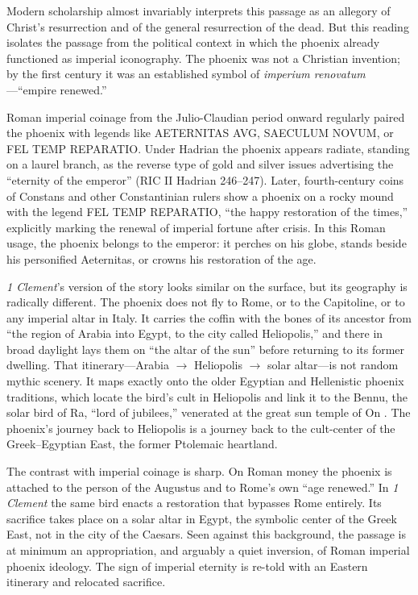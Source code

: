 Modern scholarship almost invariably interprets this passage as an allegory of Christ's resurrection and of the general resurrection of the dead.
But this reading isolates the passage from the political context in which the phoenix already functioned as imperial iconography.
The phoenix was not a Christian invention; by the first century it was an established symbol of \emph{imperium renovatum}---``empire renewed.''

Roman imperial coinage from the Julio-Claudian period onward regularly paired the phoenix with legends like AETERNITAS AVG, SAECULUM NOVUM, or FEL TEMP REPARATIO.
Under Hadrian the phoenix appears radiate, standing on a laurel branch, as the reverse type of gold and silver issues advertising the ``eternity of the emperor'' (RIC II Hadrian 246--247).
Later, fourth-century coins of Constans and other Constantinian rulers show a phoenix on a rocky mound with the legend FEL TEMP REPARATIO, ``the happy restoration of the times,'' explicitly marking the renewal of imperial fortune after crisis.
In this Roman usage, the phoenix belongs to the emperor: it perches on his globe, stands beside his personified Aeternitas, or crowns his restoration of the age.

\emph{1 Clement}'s version of the story looks similar on the surface, but its geography is radically different.
The phoenix does not fly to Rome, or to the Capitoline, or to any imperial altar in Italy.
It carries the coffin with the bones of its ancestor from ``the region of Arabia into Egypt, to the city called Heliopolis,'' and there in broad daylight lays them on ``the altar of the sun'' before returning to its former dwelling.
That itinerary---Arabia $\rightarrow$ Heliopolis $\rightarrow$ solar altar---is not random mythic scenery.
It maps exactly onto the older Egyptian and Hellenistic phoenix traditions, which locate the bird's cult in Heliopolis and link it to the Bennu, the solar bird of Ra, ``lord of jubilees,'' venerated at the great sun temple of On \cite[2.73]{herodotus:histories}.
The phoenix's journey back to Heliopolis is a journey back to the cult-center of the Greek--Egyptian East, the former Ptolemaic heartland.

The contrast with imperial coinage is sharp.
On Roman money the phoenix is attached to the person of the Augustus and to Rome's own ``age renewed.''
In \emph{1 Clement} the same bird enacts a restoration that bypasses Rome entirely.
Its sacrifice takes place on a solar altar in Egypt, the symbolic center of the Greek East, not in the city of the Caesars.
Seen against this background, the passage is at minimum an appropriation, and arguably a quiet inversion, of Roman imperial phoenix ideology.
The sign of imperial eternity is re-told with an Eastern itinerary and relocated sacrifice.

